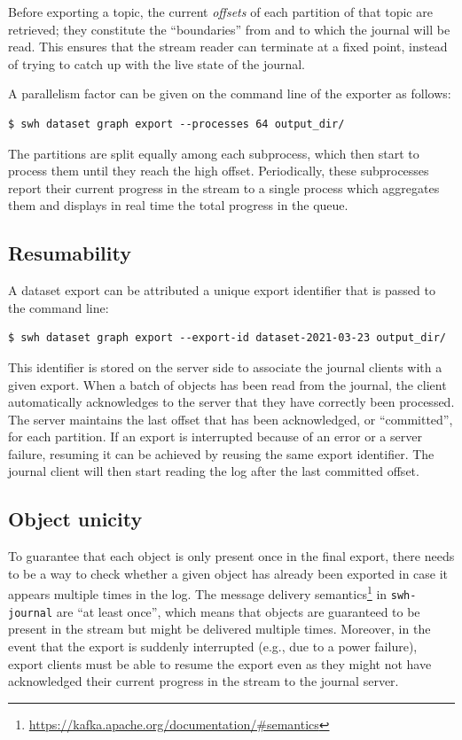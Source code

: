 Before exporting a topic, the current \emph{offsets} of each partition of that
topic are retrieved; they constitute the ``boundaries'' from and to which the
journal will be read. This ensures that the stream reader can terminate at a
fixed point, instead of trying to catch up with the live state of the journal.

A parallelism factor can be given on the command line of the exporter as
follows:

\begin{verbatim}
$ swh dataset graph export --processes 64 output_dir/
\end{verbatim}

The partitions are split equally among each subprocess, which then start to
process them until they reach the high offset. Periodically, these subprocesses
report their current progress in the stream to a single process which
aggregates them and displays in real time the total progress in the queue.

\subsection{Resumability}

A dataset export can be attributed a unique export identifier that is passed
to the command line:

\begin{verbatim}
$ swh dataset graph export --export-id dataset-2021-03-23 output_dir/
\end{verbatim}

This identifier is stored on the server side to associate the journal clients
with a given export.
When a batch of objects has been read from the journal, the client
automatically acknowledges to the server that they have correctly been
processed. The server maintains the last offset that has been acknowledged, or
``committed'', for each partition.
If an export is interrupted because of an error or a server failure, resuming
it can be achieved by reusing the same export identifier. The journal client
will then start reading the log after the last committed offset.

\subsection{Object unicity}%
\label{sec:dataset-export-unicity}

To guarantee that each object is only present once in the final export, there
needs to be a way to check whether a given object has already been exported in
case it appears multiple times in the log. The message delivery
semantics\footnote{\url{https://kafka.apache.org/documentation/\#semantics}} in
\texttt{swh-journal} are ``at least once'', which means that objects are
guaranteed to be present in the stream but might be delivered multiple times.
Moreover, in the event that the export is suddenly interrupted (e.g., due to a
power failure), export clients must be able to resume the export even as they
might not have acknowledged their current progress in the stream to the journal
server.

